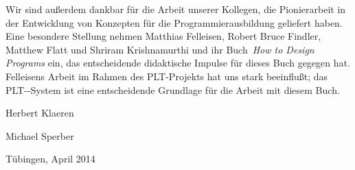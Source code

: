 Wir sind außerdem dankbar für die Arbeit unserer Kollegen, die
Pionierarbeit in der Entwicklung von Konzepten für die
Programmierausbildung geliefert haben.  Eine besondere
Stellung nehmen Matthias Felleisen, Robert Bruce Findler, Matthew
Flatt und Shriram Krishnamurthi und ihr Buch~\textit{How to Design
  Programs} \cite{FelleisenFindlerFlattKrishnamurthi2001} ein, das
entscheidende didaktische Impulse für dieses Buch gegegen hat.
Felleisens Arbeit im Rahmen des PLT-Projekts hat uns stark beeinflußt;
das PLT-\drscheme{}-System ist eine entscheidende Grundlage für die
Arbeit mit diesem Buch.

\begin{flushright}
  Herbert Klaeren

  Michael Sperber

  Tübingen, April 2014
\end{flushright}


\newpage

\thispagestyle{empty}


